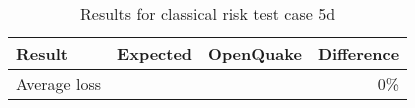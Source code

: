 \begin{table}[htbp]

\centering
\begin{tabular}{ l r r r }

\hline
\rowcolor{anti-flashwhite}
\bf{Result} & \bf{Expected} & \bf{OpenQuake} & \bf{Difference}\\
\hline
Average loss &  &  & 0\% \\
\hline
\end{tabular}

\caption{Results for classical risk test case 5d}
\label{tab:result-classical-risk-5d}
\end{table}